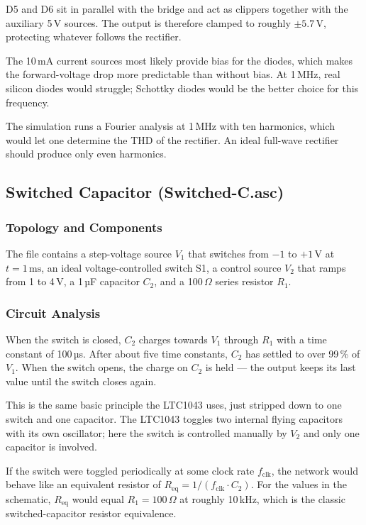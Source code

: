 D5 and D6 sit in parallel with the bridge and act as clippers together with the auxiliary 5\,V sources. The output is therefore clamped to roughly $\pm 5.7\,\text{V}$, protecting whatever follows the rectifier.

The 10\,mA current sources most likely provide bias for the diodes, which makes the forward-voltage drop more predictable than without bias. At 1\,MHz, real silicon diodes would struggle; Schottky diodes would be the better choice for this frequency.

The simulation runs a Fourier analysis at 1\,MHz with ten harmonics, which would let one determine the THD of the rectifier. An ideal full-wave rectifier should produce only even harmonics.

\subsection{Switched Capacitor (Switched-C.asc)}

\subsubsection{Topology and Components}

The file contains a step-voltage source $V_1$ that switches from $-1$ to $+1\,\text{V}$ at $t = 1\,\text{ms}$, an ideal voltage-controlled switch S1, a control source $V_2$ that ramps from 1 to 4\,V, a 1\,µF capacitor $C_2$, and a 100\,$\Omega$ series resistor $R_1$.

\subsubsection{Circuit Analysis}

When the switch is closed, $C_2$ charges towards $V_1$ through $R_1$ with a time constant of 100\,µs. After about five time constants, $C_2$ has settled to over 99\,\% of $V_1$. When the switch opens, the charge on $C_2$ is held --- the output keeps its last value until the switch closes again.

This is the same basic principle the LTC1043 uses, just stripped down to one switch and one capacitor. The LTC1043 toggles two internal flying capacitors with its own oscillator; here the switch is controlled manually by $V_2$ and only one capacitor is involved.

If the switch were toggled periodically at some clock rate $f_{\text{clk}}$, the network would behave like an equivalent resistor of $R_{\text{eq}} = 1 / (f_{\text{clk}} \cdot C_2)$. For the values in the schematic, $R_{\text{eq}}$ would equal $R_1 = 100\,\Omega$ at roughly 10\,kHz, which is the classic switched-capacitor resistor equivalence.

